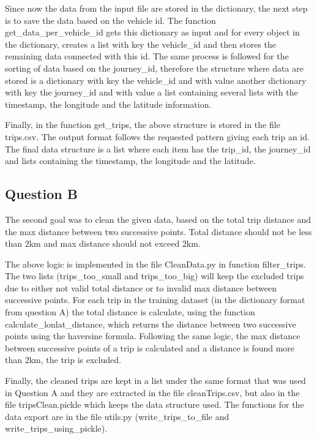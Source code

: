 \documentclass[12pt]{article}
\begin{document}
	Since now the data from the input file are stored in the dictionary, the next step is to save the data based on the vehicle id. The function get\_data\_per\_vehicle\_id gets this dictionary as input and for every object in the dictionary, creates a list with key the vehicle\_id and then stores the remaining data connected with this id. The same process is followed for the sorting of data based on the journey\_id, therefore the structure where data are stored is a dictionary with key the vehicle\_id and with value another dictionary with key the journey\_id and with value a list containing several lists with the timestamp, the longitude and the latitude information.
	
	Finally, in the function get\_trips, the above structure is stored in the file trips.csv. The output format follows the requested pattern giving each trip an id. The final data structure is a list where each item has the trip\_id, the journey\_id and lists containing the timestamp, the longitude and the latitude.
	
	\subsection{Question B}
	The second goal was to clean the given data, based on the total trip distance and the max distance between two successive points. Total distance should not be less than 2km and max distance should not exceed 2km.
	
	The above logic is implemented in the file CleanData.py in function filter\_trips. The two lists (trips\_too\_small and trips\_too\_big) will keep the excluded trips due to either not valid total distance or to invalid max distance between successive points. For each trip in the training dataset (in the dictionary format from question A) the total distance is calculate, using the function calculate\_lonlat\_distance, which returns the distance between two successive points using the haversine formula. Following the same logic, the max distance between successive points of a trip is calculated and a distance is found more than 2km, the trip is excluded.
	
	Finally, the cleaned trips are kept in a list under the same format that was used in Question A and they are extracted in the file cleanTrips.csv, but also in the file tripsClean.pickle which keeps the data structure used. The functions for the data export are in the file utils.py (write\_trips\_to\_file and write\_trips\_using\_pickle).
	
\end{document}
